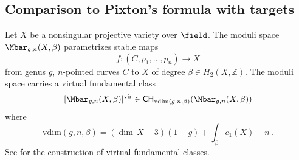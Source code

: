 \documentclass[a4paper,12pt]{article} %
\newcommand{\bb}[1]{{\mathbb{#1}}}
\newcommand{\ca}[1]{{\mathcal{#1}}}
\theoremstyle{definition}
\theoremstyle{plain}%
\newcommand{\MbarX}{\Mbar_{g,n}(X, \beta)}
\newcommand{\vdim}{\mathrm{vdim}}
\newcommand{\Chow}{\mathsf{CH}}
\begin{document}



 

\subsection{Comparison to Pixton's formula with targets}\label{sec:pixton_targets_vs_univ}
Let $X$ be a nonsingular projective variety over ${\field}$. The moduli space 
$\MbarX$ parametrizes stable maps 
$$f\colon (C,p_1,\ldots,p_n)\to X$$
from genus $g$, $n$-pointed curves $C$ to $X$ of degree $\beta \in H_2(X,\mathbb{Z})$. The moduli space carries a virtual fundamental class 
$$[\MbarX]^\textup{vir} \in \Chow_{\vdim(g,n,\beta)}(\MbarX)$$
where 
$$\vdim(g,n,\beta) = (\dim \,X -3)(1-g) + \int_{\beta} c_{1}(X) + n\, .$$
See \cite{Behrend1997The-intrinsic-n} for the construction of virtual fundamental classes.
\end{document}
